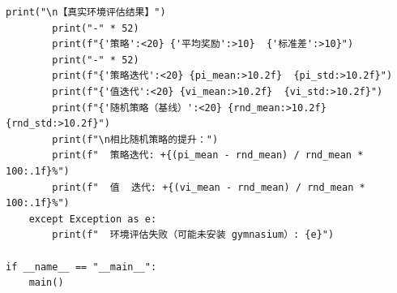 \documentclass[12pt,a4paper]{article}
\begin{document}
\begin{lstlisting}[caption={策略迭代与值迭代算法完整实现（3.py）}]
        print("\n【真实环境评估结果】")
        print("-" * 52)
        print(f"{'策略':<20} {'平均奖励':>10}  {'标准差':>10}")
        print("-" * 52)
        print(f"{'策略迭代':<20} {pi_mean:>10.2f}  {pi_std:>10.2f}")
        print(f"{'值迭代':<20} {vi_mean:>10.2f}  {vi_std:>10.2f}")
        print(f"{'随机策略（基线）':<20} {rnd_mean:>10.2f}  {rnd_std:>10.2f}")
        print(f"\n相比随机策略的提升：")
        print(f"  策略迭代: +{(pi_mean - rnd_mean) / rnd_mean * 100:.1f}%")
        print(f"  值  迭代: +{(vi_mean - rnd_mean) / rnd_mean * 100:.1f}%")
    except Exception as e:
        print(f"  环境评估失败（可能未安装 gymnasium）: {e}")

if __name__ == "__main__":
    main()
\end{lstlisting}
\end{document}
